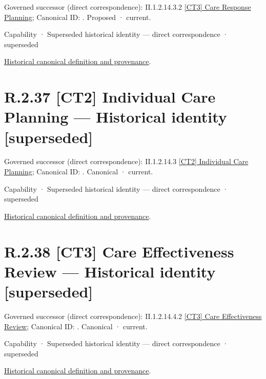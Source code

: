{\small Governed successor (direct correspondence): II.1.2.14.3.2 \hyperref[element:2636e43903e44a97ad5b8db32692ce8b]{[CT3] Care Response Planning}; Canonical ID: \texttt{}. Proposed · current.}\par
\label{element:d64569acaf2c44f3b2a5332f74fff7c7}
{\small Capability · Superseded historical identity — direct correspondence · superseded}\par
\href{../../../../../../../continuum/strategy/capability/d64569acaf2c44f3b2a5332f74fff7c7.md}{Historical canonical definition and provenance}.\par
\section*{R.2.37 [CT2] Individual Care Planning — Historical identity [superseded]}
\label{navigation:R.2.37}

{\small Governed successor (direct correspondence): II.1.2.14.3 \hyperref[element:f036a9866459429a8fb5f5e10727b5e8]{[CT2] Individual Care Planning}; Canonical ID: \texttt{}. Canonical · current.}\par
\label{element:574e61e230e643f78c58649adb4db313}
{\small Capability · Superseded historical identity — direct correspondence · superseded}\par
\href{../../../../../../../continuum/strategy/capability/574e61e230e643f78c58649adb4db313.md}{Historical canonical definition and provenance}.\par
\section*{R.2.38 [CT3] Care Effectiveness Review — Historical identity [superseded]}
\label{navigation:R.2.38}

{\small Governed successor (direct correspondence): II.1.2.14.4.2 \hyperref[element:79cfeaefeb174a54ba43343d37f035c1]{[CT3] Care Effectiveness Review}; Canonical ID: \texttt{}. Canonical · current.}\par
\label{element:31f49cdea9f44f188459503580c2b86e}
{\small Capability · Superseded historical identity — direct correspondence · superseded}\par
\href{../../../../../../../continuum/strategy/capability/31f49cdea9f44f188459503580c2b86e.md}{Historical canonical definition and provenance}.\par
